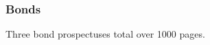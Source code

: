 \subsubsection{Bonds}\label{sec:findings-bonds}\indent

 Three bond prospectuses total over 1000 pages.    




